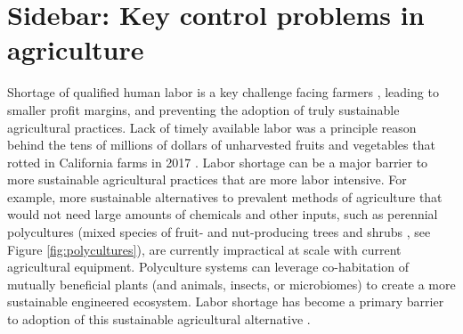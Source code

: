 \section[How can control engineers help agriculture?]{Sidebar: Key control problems in agriculture}\label{sb:ag}


Shortage of qualified human labor is a key challenge facing farmers \cite{richards2018immigration,hertz2013there}, leading to smaller profit margins, and preventing the adoption of truly sustainable agricultural practices. Lack of timely available labor was a principle reason behind the tens of millions of dollars of unharvested fruits and vegetables that rotted in California farms in 2017 \cite{guthman2017paradoxes,RN4026}.  Labor shortage can be a major barrier to more sustainable agricultural practices that are more labor intensive.
For example, more sustainable alternatives to prevalent methods of agriculture that would not need large amounts of chemicals and other inputs, such as perennial polycultures (mixed species of fruit- and nut-producing trees and shrubs \cite{lovell2017temperate}, see Figure \ref{fig:polycultures}), are currently impractical at scale with current agricultural equipment. Polyculture systems can leverage co-habitation of mutually beneficial plants (and animals, insects, or microbiomes) to create a more sustainable engineered ecosystem. Labor shortage has become a primary barrier to adoption of this sustainable agricultural alternative \cite{RN4017,RN4018}.  %
